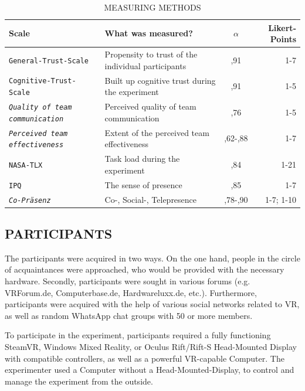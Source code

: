 \documentclass[sigchi]{acmart}
\begin{document}
\begin{table}
  \caption{MEASURING METHODS}
  \label{questionnaires}
  \begin{tabular}{llcr}
    \toprule
    Scale & What was measured? & $\alpha$ & Likert-Points \\
    \midrule
    \texttt{General-Trust-Scale \citep{couch1996assessment}} & Propensity to trust of the individual participants & ,91 & 1-7 \\
    
    \texttt{Cognitive-Trust-Scale \citep[p. 37]{mcallister1995affect}} &Built up cognitive trust during the experiment & ,91 & 1-5\\
    
     \texttt{\textit{Quality of team communication} \citep[p. 1049]{gonzalez2014climate}} & Perceived quality of team communication & ,76 & 1-5 \\
     
      \texttt{\textit{Perceived team effectiveness}\citep[p. 469]{gibson2003team}} & Extent of the perceived team effectiveness & ,62-,88 & 1-7\\
          
       \texttt{NASA-TLX\citep{NASATLX}} & Task load during the experiment & ,84 &1-21  \\
       
       \texttt{IPQ \citep{IPQ}} & The sense of presence & ,85 & 1-7 \\
       
        \texttt{\textit{Co-Präsenz} \citep[p. 487]{nowak2003effect}} &  Co-, Social-, Telepresence & ,78-,90 & 1-7; 1-10 \\
    \bottomrule
  \end{tabular}
\end{table}

\subsection{PARTICIPANTS}

The participants were acquired in two ways. On the one hand, people in the circle of acquaintances were approached, who would be provided with the necessary hardware. Secondly, participants were sought in various forums (e.g. VRForum.de, Computerbase.de, Hardwareluxx.de, etc.). Furthermore, participants were acquired with the help of various social networks related to VR, as well as random WhatsApp chat groups with 50 or more members.

To participate in the experiment, participants required a fully functioning SteamVR, Windows Mixed Reality, or Oculus Rift/Rift-S Head-Mounted Display with compatible controllers, as well as a powerful VR-capable Computer. The experimenter used a Computer without a Head-Mounted-Display, to control and manage the experiment from the outside.
\end{document}
